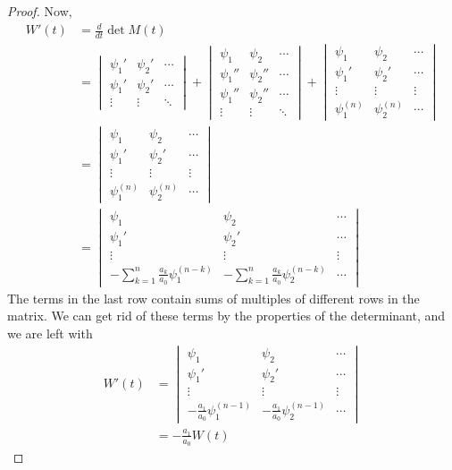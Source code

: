\documentclass[12pt]{article}
\begin{document}
\begin{proof}
Now,
\[
\begin{aligned}
  W'(t) &= \frac{d}{dt}\det{M(t)} \\
  &= \begin{vmatrix} \psi_1' & \psi_2' & \cdots \\ \psi_1' & \psi_2' & \cdots \\ \vdots & \vdots & \ddots \end{vmatrix} + 
  \begin{vmatrix} \psi_1 & \psi_2 & \cdots \\ \psi_1'' & \psi_2'' & \cdots  \\ \psi_1'' & \psi_2'' & \cdots \\ \vdots & \vdots & \ddots \end{vmatrix} + \begin{vmatrix} \psi_1 & \psi_2 & \cdots \\ \psi_1' & \psi_2' & \cdots \\ \vdots & \vdots & \vdots \\ \psi_1^{(n)} & \psi_2^{(n)} & \cdots \end{vmatrix} \\
  &=  \begin{vmatrix} \psi_1 & \psi_2 & \cdots \\ \psi_1' & \psi_2' & \cdots \\ \vdots & \vdots & \vdots \\ \psi_1^{(n)} & \psi_2^{(n)} & \cdots \end{vmatrix} \\
  &= \begin{vmatrix}
  \psi_1 & \psi_2 & \cdots \\ \psi_1' & \psi_2' & \cdots \\ \vdots & \vdots & \vdots \\ -\displaystyle\sum_{k=1}^n\frac{a_k}{a_0}\psi_1^{(n-k)} & -\displaystyle\sum_{k=1}^n\frac{a_k}{a_0}\psi_2^{(n-k)} & \cdots 
  \end{vmatrix}
\end{aligned}
\]
The terms in the last row contain sums of multiples of different rows in the matrix. We can get rid of these terms by the properties of the determinant, and we are left with 
\[
\begin{aligned}
  W'(t) &= \begin{vmatrix}
  \psi_1 & \psi_2 & \cdots \\ \psi_1' & \psi_2' & \cdots \\ \vdots & \vdots & \vdots \\ -\frac{a_1}{a_0}\psi_1^{(n-1)} & -\frac{a_1}{a_0}\psi_2^{(n-1)} & \cdots 
  \end{vmatrix} \\
  &= -\frac{a_1}{a_0}W(t)
\end{aligned}
\]
\end{proof}
\end{document}
